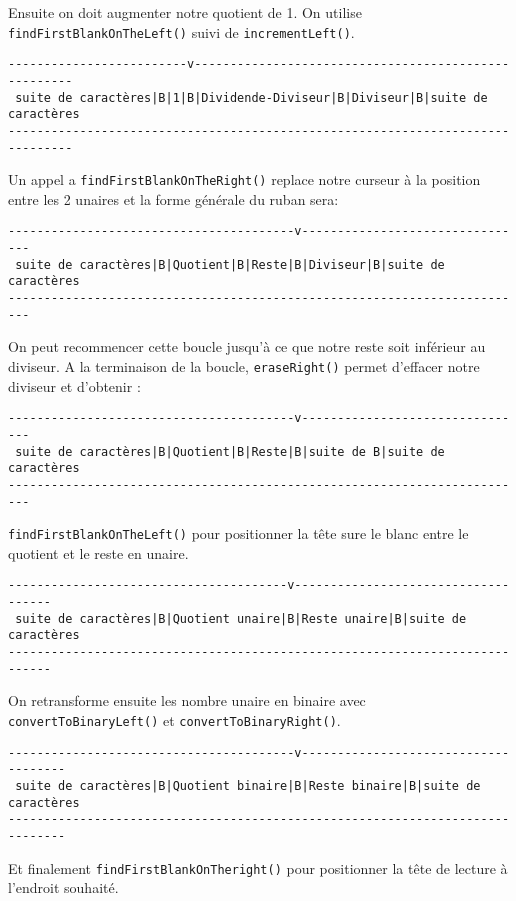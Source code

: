 \documentclass[a4paper,11pt]{article}
\begin{document}
Ensuite on doit augmenter notre quotient de 1. On utilise \texttt{findFirstBlankOnTheLeft()} suivi de \texttt{incrementLeft()}.
\begin{small}
\begin{verbatim}
-------------------------v-----------------------------------------------------
 suite de caractères|B|1|B|Dividende-Diviseur|B|Diviseur|B|suite de caractères
-------------------------------------------------------------------------------
\end{verbatim}
\end{small}
Un appel a \texttt{findFirstBlankOnTheRight()} replace notre curseur à la position entre les 2 unaires et la forme générale du ruban sera: 
\begin{small}
\begin{verbatim}
----------------------------------------v--------------------------------
 suite de caractères|B|Quotient|B|Reste|B|Diviseur|B|suite de caractères
-------------------------------------------------------------------------
\end{verbatim}
\end{small}
On peut recommencer cette boucle jusqu'à ce que notre reste soit inférieur au diviseur. A la terminaison de la boucle, \texttt{eraseRight()} permet d'effacer notre diviseur
et d'obtenir :
\begin{small}
\begin{verbatim}
----------------------------------------v--------------------------------
 suite de caractères|B|Quotient|B|Reste|B|suite de B|suite de caractères
-------------------------------------------------------------------------
\end{verbatim}
\end{small}
\texttt{findFirstBlankOnTheLeft()} pour positionner la tête sure le blanc entre le quotient et le reste en unaire.
\begin{small}
\begin{verbatim}
---------------------------------------v------------------------------------
 suite de caractères|B|Quotient unaire|B|Reste unaire|B|suite de caractères
----------------------------------------------------------------------------
\end{verbatim}
\end{small}
On retransforme ensuite les nombre unaire en binaire avec \texttt{convertToBinaryLeft()} et \texttt{convert\-To\-Binary\-Right()}.
\begin{small}
\begin{verbatim}
----------------------------------------v-------------------------------------
 suite de caractères|B|Quotient binaire|B|Reste binaire|B|suite de caractères
------------------------------------------------------------------------------
\end{verbatim}
\end{small}
Et finalement \texttt{findFirstBlankOnTheright()} pour positionner la tête de lecture à l'endroit souhaité.
\end{document}
